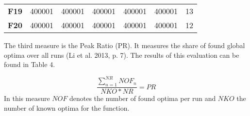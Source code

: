 \documentclass[12pt,a4paper]{article}
\begin{document}
\begin{longtable}[c]{@{}crrrrrr@{}}
\begin{minipage}[t]{0.11\columnwidth}
\textbf{F19}
\strut\end{minipage} &
\begin{minipage}[t]{0.08\columnwidth}\raggedleft\strut
400001
\strut\end{minipage} &
\begin{minipage}[t]{0.08\columnwidth}\raggedleft\strut
400001
\strut\end{minipage} &
\begin{minipage}[t]{0.09\columnwidth}\raggedleft\strut
400001
\strut\end{minipage} &
\begin{minipage}[t]{0.10\columnwidth}\raggedleft\strut
400001
\strut\end{minipage} &
\begin{minipage}[t]{0.11\columnwidth}\raggedleft\strut
400001
\strut\end{minipage} &
\begin{minipage}[t]{0.07\columnwidth}\raggedleft\strut
13
\strut\end{minipage}\tabularnewline
\begin{minipage}[t]{0.11\columnwidth}\centering\strut
\textbf{F20}
\strut\end{minipage} &
\begin{minipage}[t]{0.08\columnwidth}\raggedleft\strut
400001
\strut\end{minipage} &
\begin{minipage}[t]{0.08\columnwidth}\raggedleft\strut
400001
\strut\end{minipage} &
\begin{minipage}[t]{0.09\columnwidth}\raggedleft\strut
400001
\strut\end{minipage} &
\begin{minipage}[t]{0.10\columnwidth}\raggedleft\strut
400001
\strut\end{minipage} &
\begin{minipage}[t]{0.11\columnwidth}\raggedleft\strut
400001
\strut\end{minipage} &
\begin{minipage}[t]{0.07\columnwidth}\raggedleft\strut
12
\strut\end{minipage}\tabularnewline
\bottomrule
\end{longtable}

The third measure is the Peak Ratio (PR). It measures the share of found
global optima over all runs (Li et al. 2013, p. 7). The results of this
evaluation can be found in Table 4.

\[\frac{\sum\nolimits_{n=1}^{NR} NOF_{n}}{NKO * NR} = PR\] \newline
In this measure \(NOF\) denotes the number of found optima per run and
\(NKO\) the number of known optima for the function. \newline
\end{document}
